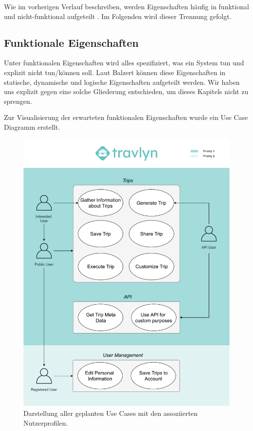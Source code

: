 Wie im vorherigen Verlauf beschreiben, werden Eigenschaften häufig in funktional und nicht-funktional aufgeteilt \cite{Balzert.2009}. Im Folgenden wird dieser Trennung gefolgt.

\subsection{Funktionale Eigenschaften}
\label{sec:funcReq}
Unter funktionalen Eigenschaften wird alles spezifiziert, was ein System tun und explizit nicht tun/können soll. Laut Balzert können diese Eigenschaften in statische, dynamische und logische Eigenschaften aufgeteilt werden\cite{Balzert.2009}. Wir haben uns explizit gegen eine solche Gliederung entschieden, um dieses Kapitels nicht zu sprengen.

\vspace{0.25cm}

Zur Visualisierung der erwarteten funktionalen Eigenschaften wurde ein Use Case Diagramm erstellt.
\begin{figure}[H]
	\centering
	\includegraphics[width=1\textwidth]{../ucd/UCD.pdf}
	\caption{Darstellung aller geplanten Use Cases mit den assoziierten Nutzerprofilen.}
	\label{fig:UCD}
\end{figure}

